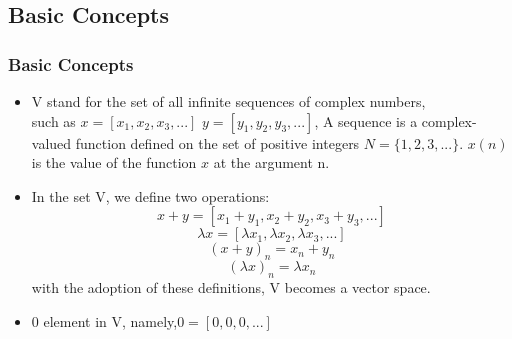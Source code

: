 \documentclass[notheorems,mathserif,table,compress]{beamer}  %
\begin{document}
\subsection{Basic  Concepts} %
\begin{frame}
\frametitle{Basic  Concepts}
\begin{itemize}
\item V stand for  the set of all infinite  sequences of complex numbers,\\
such  as  $x=[x_{1}, x_{2}, x_{3}, ...]$   $y=[y_{1}, y_{2}, y_{3}, ...]$,  A sequence is a complex-valued  function  defined  on  the  set of positive  integers $N=\{1,2,3,...\}$. $x(n)$ is the value of the function $x$ at  the  argument n. 
\item In the  set V, we define two operations:
\begin{displaymath} 
x+y=[{x_{1}+y_{1}}, {x_{2}+y_{2}}, {x_{3}+y_{3}},...]
\end{displaymath}
\begin{displaymath}
{\lambda x} =[{\lambda x_{1}}, {\lambda x_{2}}, {\lambda x_{3}},...]
\end{displaymath}
\begin{displaymath}
(x+y)_n=x_n+y_n
\end{displaymath}
\begin{displaymath}
(\lambda x)_n=\lambda x_n
\end{displaymath}
with  the adoption of these definitions, V becomes a vector space. 
\item $0$ element in V, namely,$0=[0,0,0,...]$
\end{itemize}
\end{frame}

\end{document}
